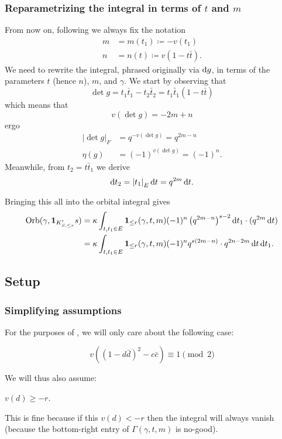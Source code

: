\subsubsection{Reparametrizing the integral in terms of $t$ and $m$}
From now on, following \cite{ref:AFL} we always fix the notation
\begin{align*}
  m &= m(t_1) \coloneqq -v(t_1) \\
  n &= n(t) \coloneqq v(1-t\bar t).
\end{align*}
We need to rewrite the integral, phrased originally via $\odif g$,
in terms of the parameters $t$ (hence $n$), $m$, and $\gamma$.
We start by observing that
\[ \det g = t_1 \bar t_1 - t_2 \bar t_2 = t_1 \bar t_1 (1 - t\bar t) \]
which means that
\[ v(\det g) = -2m + n \]
ergo
\begin{align*}
  \left\lvert \det g \right\rvert_F &= q^{-v(\det g)} = q^{2m-n} \\
  \eta(g) &= (-1)^{v(\det g)} = (-1)^n.
\end{align*}
Meanwhile, from $t_2 = t \bar t_1$ we derive
\[ \odif t_2 = \left\lvert t_1 \right\rvert_E \odif t = q^{2m} \odif t. \]

Bringing this all into the orbital integral gives
\begin{align*}
  \Orb(\gamma, \mathbf{1}_{K'_{S, \le r}} s)
  &= \kappa \int_{t, t_1 \in E} \mathbf{1}_{\le r}(\gamma, t, m)
  (-1)^n \left( q^{2m-n} \right)^{s-2} \odif t_1 \cdot (q^{2m} \odif t) \\
  &= \kappa \int_{t, t_1 \in E} \mathbf{1}_{\le r}(\gamma, t, m)
  (-1)^n q^{s(2m-n)} \cdot q^{2n-2m} \odif t \odif t_1.
\end{align*}

\subsection{Setup}
\subsubsection{Simplifying assumptions}
For the purposes of \cite{ref:AFL},
we will only care about the following case:
\begin{assume}
  \[ v\left( (1-d\bar d)^2 - c \bar c\right) \equiv 1 \pmod 2 \]
  \label{assume:u_odd}
\end{assume}

We will thus also assume:
\begin{assume}
  $v(d) \geq -r$.
\end{assume}
This is fine because if this $v(d) < -r$ then the integral will always vanish
(because the bottom-right entry of $\Gamma(\gamma, t, m)$ is no-good).

